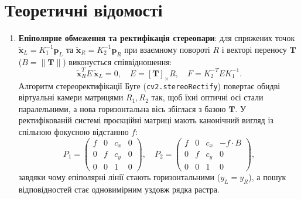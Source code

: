 \documentclass[14pt, a4paper]{extarticle}
\begin{document}
\section{Теоретичні відомості}
\begin{enumerate}
    \item \textbf{Епіполярне обмеження та ректифікація стереопари}: для спряжених точок $\tilde{\mathbf{x}}_L = K_1^{-1}\mathbf{p}_L$ та $\tilde{\mathbf{x}}_R = K_2^{-1}\mathbf{p}_R$ при взаємному повороті $R$ і векторі переносу $\mathbf{T}$ ($B = \|\mathbf{T}\|$) виконується співвідношення:
    \begin{equation}\label{eq:epipolar}
        \tilde{\mathbf{x}}_R^T E \, \tilde{\mathbf{x}}_L = 0, \quad E = [\mathbf{T}]_\times R, \quad F = K_2^{-T} E K_1^{-1}.
    \end{equation}
    Алгоритм стереоректифікації Буге (\texttt{cv2.stereoRectify}) повертає обидві віртуальні камери матрицями $R_1, R_2$ так, щоб їхні оптичні осі стали паралельними, а нова горизонтальна вісь збіглася з базою $\mathbf{T}$. У ректифікованій системі проєкційні матриці мають канонічний вигляд із спільною фокусною відстанню $f$:
    \begin{equation}\label{eq:rect_p}
        P_1 = \begin{pmatrix} f & 0 & c_x & 0 \\ 0 & f & c_y & 0 \\ 0 & 0 & 1 & 0 \end{pmatrix}, \quad
        P_2 = \begin{pmatrix} f & 0 & c_x & -f \cdot B \\ 0 & f & c_y & 0 \\ 0 & 0 & 1 & 0 \end{pmatrix},
    \end{equation}
    завдяки чому епіполярні лінії стають горизонтальними ($y_L = y_R$), а пошук відповідностей стає одновимірним уздовж рядка растра.


\end{enumerate}
\end{document}
